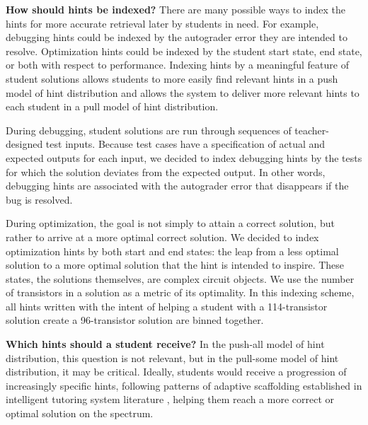 {\bf How should hints be indexed?} There are many possible ways to index the hints for more accurate retrieval later by students in need. For example, debugging hints could be indexed by the autograder error they are intended to resolve. Optimization hints could be indexed by the student start state, end state, or both with respect to performance. Indexing hints by a meaningful feature of student solutions allows students to more easily find relevant hints in a push model of hint distribution and allows the system to deliver more relevant hints to each student in a pull model of hint distribution. 

During debugging, student solutions are run through sequences of teacher-designed test inputs. Because test cases have a specification of actual and expected outputs for each input, we decided to index debugging hints by the tests for which the solution deviates from the expected output. In other words, debugging hints are associated with the autograder error that disappears if the bug is resolved. 

During optimization, the goal is not simply to attain a correct solution, but rather to arrive at a more optimal correct solution. We decided to index optimization hints by both start and end states: the leap from a less optimal solution to a more optimal solution that the hint is intended to inspire. These states, the solutions themselves, are complex circuit objects. We use the number of transistors in a solution as a metric of its optimality. In this indexing scheme, all hints written with the intent of helping a student with a 114-transistor solution create a 96-transistor solution are binned together.

{\bf Which hints should a student receive?} In the push-all model of hint distribution, this question is not relevant, but in the pull-some model of hint distribution, it may be critical. Ideally, students would receive a progression of increasingly specific hints, following patterns of adaptive scaffolding established in intelligent tutoring system literature \cite{andes}, helping them reach a more correct or optimal solution on the spectrum. 

